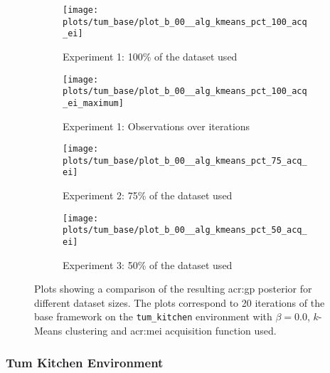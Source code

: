 \begin{figure}[t]
	\centering
	\captionsetup{font=small}
	\captionsetup[subfigure]{font=footnotesize}
	\captionsetup[subfigure]{justification=centering}
	\begin{subfigure}[t]{0.495\textwidth}
		\texttt{[image: plots/tum\_base/plot\_b\_00\_\_alg\_kmeans\_pct\_100\_acq\_ei]}
		\caption{Experiment 1: 100\% of the dataset used}
		\label{fig:exp1}
	\end{subfigure}
	\begin{subfigure}[t]{0.495\textwidth}
		\texttt{[image: plots/tum\_base/plot\_b\_00\_\_alg\_kmeans\_pct\_100\_acq\_ei\_maximum]}
		\caption{Experiment 1: Observations over iterations}
		\label{fig:exp1_observations}
	\end{subfigure}
	\begin{subfigure}[t]{0.495\textwidth}
		\texttt{[image: plots/tum\_base/plot\_b\_00\_\_alg\_kmeans\_pct\_75\_acq\_ei]}
		\caption{Experiment 2: 75\% of the dataset used}
		\label{fig:exp2}
	\end{subfigure}
	\begin{subfigure}[t]{0.495\textwidth}
		\texttt{[image: plots/tum\_base/plot\_b\_00\_\_alg\_kmeans\_pct\_50\_acq\_ei]}
		\caption{Experiment 3: 50\% of the dataset used}
		\label{fig:exp3}
	\end{subfigure}
	\caption{Plots showing a comparison of the resulting \acrshort{acr:gp} posterior for different dataset sizes. The plots correspond to 20 iterations of the base framework on the \texttt{tum\_kitchen} environment with $\beta = 0.0$, $k$-Means clustering and \acrshort{acr:mei} acquisition function used.}
	\label{fig:plots_tum_base_data}
\end{figure}

\subsubsection{Tum Kitchen Environment}

